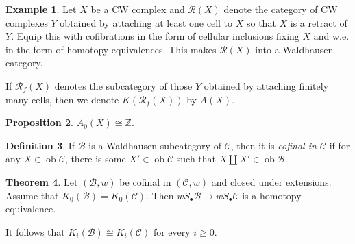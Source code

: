 \documentclass[10pt,letterpaper,cm]{nupset}
\theoremstyle{definition}
\newtheorem{definition}{Definition}
\newtheorem{exmp}[definition]{Example}
\theoremstyle{theorem}
\newtheorem{theorem}[definition]{Theorem}
\newtheorem{prop}[definition]{Proposition}
\theoremstyle{remark}
\newcommand{\Z}{\mathbb Z}
\newcommand{\1}{\mathbf{1}}
\renewcommand{\b}{\mathscr{B}}
\renewcommand{\c}{\mathscr{C}}
\newcommand{\0}{\vec 0}
\DeclareMathOperator{\ob}{ob}
\begin{document}
\begin{exmp}
Let $X$ be a CW complex and $\mathcal{R}(X)$ denote the category of CW complexes $Y$  obtained  by attaching at least one cell to $X$ so that $X$ is a retract of $Y$. Equip this with cofibrations in the form of cellular inclusions fixing $X$ and w.e. in the form of homotopy equivalences. This makes $\mathcal{R}(X)$ into a Waldhausen category. 

\smallskip
If $\mathcal{R}_f(X)$ denotes the subcategory of those $Y$ obtained by attaching finitely many cells, then we denote  $K(\mathcal{R}_f(X))$ by $A(X)$.
\end{exmp}

\begin{prop}
$A_0(X)\cong \Z$.
\end{prop}

\begin{definition}
If $\b$ is a Waldhausen subcategory of $\c$, then it is \textit{cofinal in $\c$} if for any $X \in \ob \c$, there is some $X' \in \ob \c$ such that $X \coprod X' \in \ob \b$.
\end{definition}

\begin{theorem}
Let $\left(\b, w\right)$ be cofinal in $\left(\c, w\right)$ and closed under extensions. Assume that $K_0(\b) = K_0(\c)$. Then $wS_{\bullet}\b \to wS_{\bullet}\c$ is a homotopy equivalence.
\end{theorem}

\smallskip

It follows that $K_i(\b) \cong K_i(\c)$ for every $i\geq 0$.
\end{document}
